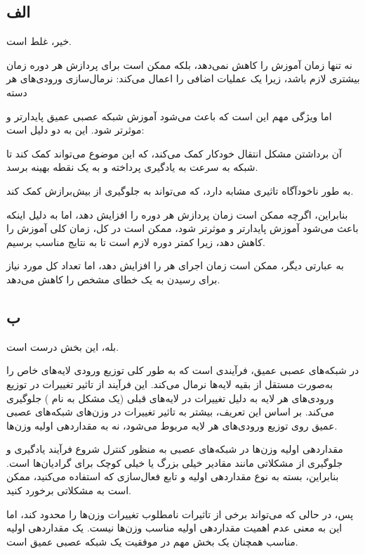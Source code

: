 \subsection*{الف}

خیر، غلط است.

نه تنها زمان آموزش را کاهش نمی‌دهد، بلکه ممکن است برای پردازش هر دوره 
زمان بیشتری لازم باشد، زیرا یک عملیات اضافی را اعمال می‌کند: نرمال‌سازی ورودی‌های هر دسته 

اما ویژگی مهم
این است که باعث می‌شود آموزش شبکه عصبی عمیق پایدارتر و موثرتر شود. این به دو دلیل است:

آن برداشتن مشکل انتقال خودکار
کمک می‌کند، که این موضوع می‌تواند کمک کند تا شبکه به سرعت به یادگیری پرداخته و به یک نقطه بهینه برسد.

به طور ناخودآگاه تاثیری مشابه
دارد، که می‌تواند به جلوگیری از بیش‌برازش
کمک کند.

بنابراین، اگرچه
ممکن است زمان پردازش هر دوره را افزایش دهد، اما به دلیل اینکه باعث می‌شود آموزش پایدارتر و موثرتر شود، ممکن است در کل، زمان کلی آموزش را کاهش دهد، زیرا کمتر دوره لازم است تا به نتایج مناسب برسیم.

به عبارتی دیگر،
ممکن است زمان اجرای هر
را افزایش دهد، اما تعداد کل
مورد نیاز برای رسیدن به یک خطای مشخص را کاهش می‌دهد.

\subsection*{ب}

بله، این بخش درست است.

در شبکه‌های عصبی عمیق، فرآیندی است که به طور کلی توزیع ورودی لایه‌های خاص را به‌صورت مستقل از بقیه لایه‌ها نرمال می‌کند. این فرآیند از تاثیر تغییرات در توزیع ورودی‌های هر لایه به دلیل تغییرات در لایه‌های قبلی (یک مشکل به نام
) جلوگیری می‌کند. بر اساس این تعریف،
بیشتر به تاثیر تغییرات در وزن‌های شبکه‌های عصبی عمیق روی توزیع ورودی‌های هر لایه مربوط می‌شود، نه به مقداردهی اولیه وزن‌ها.

مقداردهی اولیه وزن‌ها در شبکه‌های عصبی به منظور کنترل شروع فرآیند یادگیری و جلوگیری از مشکلاتی مانند مقادیر خیلی بزرگ یا خیلی کوچک برای گرادیان‌ها است. بنابراین، بسته به نوع مقداردهی اولیه و تابع فعال‌سازی که استفاده می‌کنید، ممکن است به مشکلاتی برخورد کنید.

پس، در حالی که
می‌تواند برخی از تاثیرات نامطلوب تغییرات وزن‌ها را محدود کند، اما این به معنی عدم اهمیت مقداردهی اولیه مناسب وزن‌ها نیست. یک مقداردهی اولیه مناسب همچنان یک بخش مهم در موفقیت یک شبکه عصبی عمیق است.